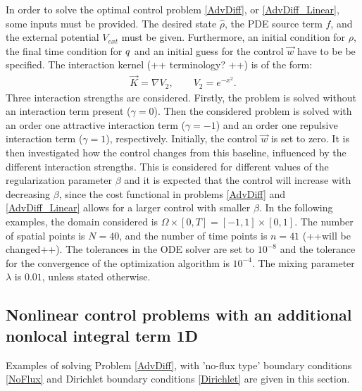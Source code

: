 
In order to solve the optimal control problem \eqref{AdvDiff}, or \eqref{AdvDiff_Linear}, some inputs must be provided. The desired state $\widehat \rho$, the PDE source term $f$, and the external potential $V_{ext}$ must be given. Furthermore, an initial condition for $\rho$, the final time condition for $q$ and an initial guess for the control $\vec{w}$ have to be be specified. 
The interaction kernel (++ terminology? ++) is of the form:
\begin{align*}
\vec{K} = \nabla V_2, \qquad V_2 = e^{-x^2}.
\end{align*}
Three interaction strengths are considered. Firstly, the problem is solved without an interaction term present ($\gamma = 0$). Then the considered problem is solved with an order one attractive interaction term ($\gamma = -1$) and an order one repulsive interaction term ($\gamma = 1$), respectively. Initially, the control $\vec{w}$ is set to zero. It is then investigated how the control changes from this baseline, influenced by the different interaction strengths. This is considered for different values of the regularization parameter $\beta$ and it is expected that the control will increase with decreasing $\beta$, since the cost functional in problems \eqref{AdvDiff} and \eqref{AdvDiff_Linear} allows for a larger control with smaller $\beta$.
In the following examples, the domain considered is $\Omega \times [0,T] = [-1,1] \times [0,1]$. The number of spatial points is $N=40$, and the number of time points is $n=41$ (++will be changed++). The tolerances in the ODE solver are set to $10^{-8}$ and the tolerance for the convergence of the optimization algorithm is $10^{-4}$. The mixing parameter $\lambda$ is $0.01$, unless stated otherwise.
\subsection{Nonlinear control problems with an additional nonlocal integral term 1D} \label{sec:Examples1d}
Examples of solving Problem \eqref{AdvDiff}, with 'no-flux type' boundary conditions \eqref{NoFlux} and Dirichlet boundary conditions \eqref{Dirichlet} are given in this section. 
 
